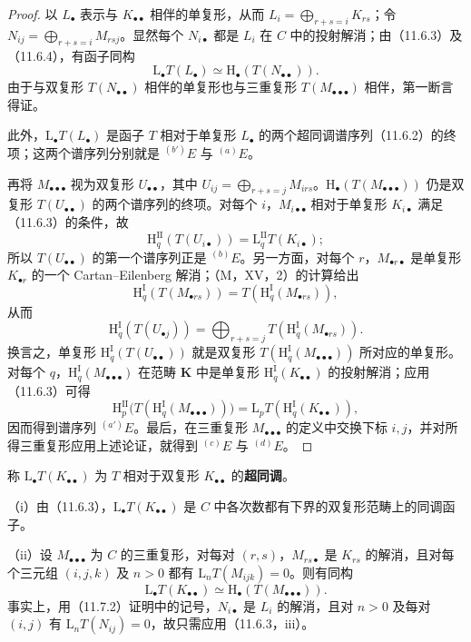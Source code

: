 \begin{proof}
以 $L_\bullet$ 表示与 $K_{\bullet\bullet}$ 相伴的单复形，从而 $L_i=\bigoplus_{r+s=i}K_{rs}$；令 $N_{ij}=\bigoplus_{r+s=i}M_{rsj}$。显然每个 $N_{i\bullet}$ 都是 $L_i$ 在 $C$ 中的投射解消；由（11.6.3）及（11.6.4），有函子同构
\[
\mathrm L_\bullet T(L_\bullet)\simeq\mathrm H_\bullet(T(N_{\bullet\bullet})).
\]
由于与双复形 $T(N_{\bullet\bullet})$ 相伴的单复形也与三重复形 $T(M_{\bullet\bullet\bullet})$ 相伴，第一断言得证。

此外，$\mathrm L_\bullet T(L_\bullet)$ 是函子 $T$ 相对于单复形 $L_\bullet$ 的两个超同调谱序列（11.6.2）的终项；这两个谱序列分别就是 ${}^{(b')}E$ 与 ${}^{(a)}E$。

再将 $M_{\bullet\bullet\bullet}$ 视为双复形 $U_{\bullet\bullet}$，其中 $U_{ij}=\bigoplus_{r+s=j}M_{irs}$。$\mathrm H_\bullet(T(M_{\bullet\bullet\bullet}))$ 仍是双复形 $T(U_{\bullet\bullet})$ 的两个谱序列的终项。对每个 $i$，$M_{i\bullet\bullet}$ 相对于单复形 $K_{i\bullet}$ 满足（11.6.3）的条件，故
\[
\mathrm H_q^{\mathrm{II}}(T(U_{i\bullet}))=\mathrm L_q^{\mathrm{II}}T(K_{i\bullet});
\]
所以 $T(U_{\bullet\bullet})$ 的第一个谱序列正是 ${}^{(b)}E$。另一方面，对每个 $r$，$M_{\bullet r\bullet}$ 是单复形 $K_{\bullet r}$ 的一个 Cartan--Eilenberg 解消；（M，XV，2）的计算给出
\[
\mathrm H_q^{\mathrm I}(T(M_{\bullet rs}))=T(\mathrm H_q^{\mathrm I}(M_{\bullet rs})),
\]
从而
\[
\mathrm H_q^{\mathrm I}(T(U_{\bullet j}))
=\bigoplus_{r+s=j}T(\mathrm H_q^{\mathrm I}(M_{\bullet rs})).
\]
换言之，单复形 $\mathrm H_q^{\mathrm I}(T(U_{\bullet\bullet}))$ 就是双复形 $T(\mathrm H_q^{\mathrm I}(M_{\bullet\bullet\bullet}))$ 所对应的单复形。对每个 $q$，$\mathrm H_q^{\mathrm I}(M_{\bullet\bullet\bullet})$ 在范畴 $\mathbf K$ 中是单复形 $\mathrm H_q^{\mathrm I}(K_{\bullet\bullet})$ 的投射解消；应用（11.6.3）可得
\[
\mathrm H_p^{\mathrm{II}}\bigl(T(\mathrm H_q^{\mathrm I}(M_{\bullet\bullet\bullet}))\bigr)
=\mathrm L_pT(\mathrm H_q^{\mathrm I}(K_{\bullet\bullet})),
\]
因而得到谱序列 ${}^{(a')}E$。最后，在三重复形 $M_{\bullet\bullet\bullet}$ 的定义中交换下标 $i,j$，并对所得三重复形应用上述论证，就得到 ${}^{(c)}E$ 与 ${}^{(d)}E$。
\end{proof}
称 $\mathrm L_\bullet T(K_{\bullet\bullet})$ 为 $T$ 相对于双复形 $K_{\bullet\bullet}$ 的\textbf{超同调}。

（i）由（11.6.3），$\mathrm L_\bullet T(K_{\bullet\bullet})$ 是 $C$ 中各次数都有下界的双复形范畴上的同调函子。

（ii）设 $M_{\bullet\bullet\bullet}$ 为 $C$ 的三重复形，对每对 $(r,s)$，$M_{rs\bullet}$ 是 $K_{rs}$ 的解消，且对每个三元组 $(i,j,k)$ 及 $n>0$ 都有 $\mathrm L_nT(M_{ijk})=0$。则有同构
\[
\mathrm L_\bullet T(K_{\bullet\bullet})\simeq\mathrm H_\bullet(T(M_{\bullet\bullet\bullet})).
\]
事实上，用（11.7.2）证明中的记号，$N_{i\bullet}$ 是 $L_i$ 的解消，且对 $n>0$ 及每对 $(i,j)$ 有 $\mathrm L_nT(N_{ij})=0$，故只需应用（11.6.3，iii）。


